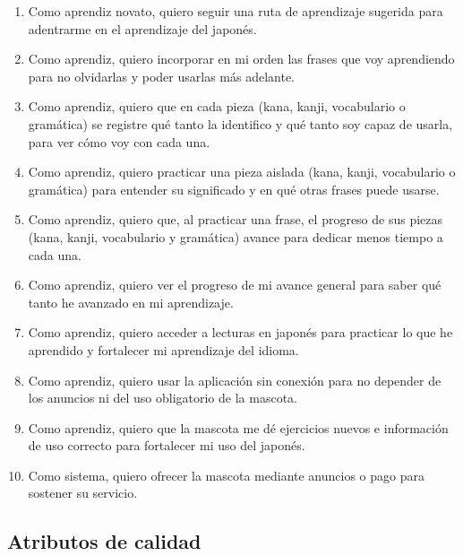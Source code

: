 \documentclass[11pt]{article}
\begin{document}
\begin{enumerate}
  \renewcommand{\labelenumi}{RF\arabic{enumi}.}
  \setlength{\itemsep}{0.35em}
  \raggedright
  \item Como aprendiz novato, quiero seguir una ruta de aprendizaje sugerida para adentrarme en el aprendizaje del japonés.
  \item Como aprendiz, quiero incorporar en mi orden las frases que voy aprendiendo para no olvidarlas y poder usarlas más adelante.
  \item Como aprendiz, quiero que en cada pieza (kana, kanji, vocabulario o gramática) se registre qué tanto la identifico y qué tanto soy capaz de usarla, para ver cómo voy con cada una.
  \item Como aprendiz, quiero practicar una pieza aislada (kana, kanji, vocabulario o gramática) para entender su significado y en qué otras frases puede usarse.
  \item Como aprendiz, quiero que, al practicar una frase, el progreso de sus piezas (kana, kanji, vocabulario y gramática) avance para dedicar menos tiempo a cada una.
  \item Como aprendiz, quiero ver el progreso de mi avance general para saber qué tanto he avanzado en mi aprendizaje.
  \item Como aprendiz, quiero acceder a lecturas en japonés para practicar lo que he aprendido y fortalecer mi aprendizaje del idioma.
  \item Como aprendiz, quiero usar la aplicación sin conexión para no depender de los anuncios ni del uso obligatorio de la mascota.
  \item Como aprendiz, quiero que la mascota me dé ejercicios nuevos e información de uso correcto para fortalecer mi uso del japonés.
  \item Como sistema, quiero ofrecer la mascota mediante anuncios o pago para sostener su servicio.
\end{enumerate}

\subsection{Atributos de calidad}
\end{document}
